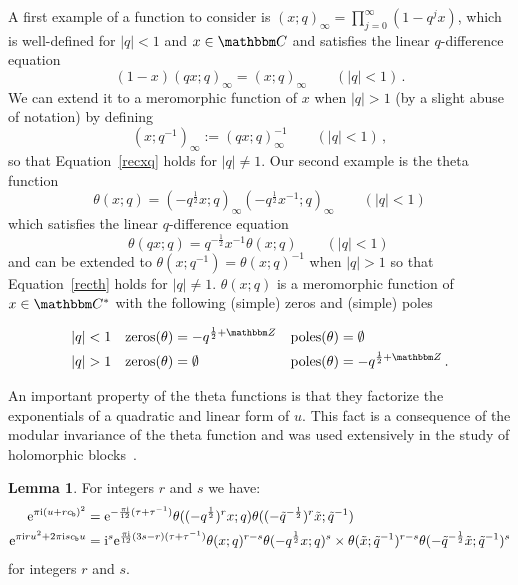 \documentclass[12pt,reqno]{amsart}
\theoremstyle{definition}
\newtheorem{lemma}[theorem]{Lemma}
\def\BZ{\mathbbm Z}
\def\BC{\mathbbm C}
\def\tq{\tilde{q}}
\def\tx{\tilde{x}}
\def\th{\theta}
\def\bb{\mathsf{b}}
\def\ri{\mathrm{i}}
\def\tx{\tilde{x}}
\def\re{{\rm e}}
\def\ri{{\rm i}}
\begin{document}
A first example of a function to consider is
$(x;q)_\infty=\prod_{j=0}^\infty (1-q^j x)$, which is well-defined for
$|q|<1$ and $x \in \BC$ and satisfies the linear $q$-difference
equation
\begin{equation}
\label{recxq}
(1-x)(qx;q)_\infty = (x;q)_\infty \qquad (|q|<1) \,.
\end{equation}
We can extend it to a meromorphic function of $x$ when $|q|>1$ (by a
slight abuse of notation) by defining
\begin{equation}
\label{xqout}
(x;q^{-1})_\infty := (qx;q)_\infty^{-1} \qquad (|q|<1)\,,
\end{equation}
so that Equation~\eqref{recxq} holds for $|q| \neq 1$. Our second
example is the theta function
\begin{equation}
\th(x;q)=(-q^{\frac{1}{2}}x;q)_\infty (-q^{\frac{1}{2}}x^{-1};q)_\infty \qquad (|q|<1)  
\end{equation}
which satisfies the linear $q$-difference equation
\begin{equation}
\label{recth}
\th(qx;q)=q^{-\frac{1}{2}} x^{-1}\th(x;q) \qquad (|q|<1) \,
\end{equation}
and can be extended to $\th(x;q^{-1})=\th(x;q)^{-1}$ when $|q|> 1$ so
that Equation~\eqref{recth} holds for $|q| \neq 1$. $\th(x;q)$ is a
meromorphic function of $x \in \BC^*$ with the following (simple)
zeros and (simple) poles

\begin{align}
  \label{thetap}
  |q| < 1 & & \text{zeros}(\th)& =-q^{\frac{1}{2}+\BZ}
  &  \text{poles}(\th) & =\emptyset \\
  \notag
  |q| > 1 & & \text{zeros}(\th)& = \emptyset
  &  \text{poles}(\th) & =-q^{\frac{1}{2}+\BZ} \,.
\end{align}

An important property of the theta functions is that they factorize
the exponentials of a quadratic and linear form of $u$. This
fact is a consequence of the modular invariance of the theta function
and was used extensively in the study of holomorphic
blocks~\cite{Beem}.

\begin{lemma}
  \label{lem.thetaf}
  For integers $r$ and $s$ we have:
  \begin{subequations}
    \begin{align}
      \label{ebx2}
      \re^{\pi \ri (u + r c_\bb)^2}
      & = \re^{-\frac{\pi \ri}{12}(\tau+\tau^{-1})} \th((-q^{\frac{1}{2}})^r x;q)
        \th((-\tq^{-\frac{1}{2}})^r\tx;\tq^{-1}) \\
      \label{ebx3}
      \re^{\pi \ri r u^2 + 2 \pi \ri s c_\bb u}
      &= \ri^s
        \re^{\frac{\pi \ri}{12}(3s-r)(\tau+\tau^{-1})}
        \th(x;q)^{r-s} \th(-q^{\frac{1}{2}} x;q)^s
        \times \th(\tx;\tq^{-1})^{r-s} \th(-\tq^{-\frac{1}{2}}\tx;\tq^{-1})^s
    \end{align}
  \end{subequations}
  for integers $r$ and $s$.
\end{lemma}
\end{document}
